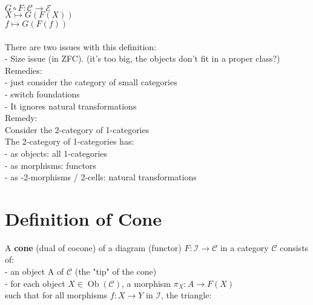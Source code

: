 \documentclass[a4paper, twoside, english, 11pt]{book}
\DeclareMathOperator{\Ob}{Ob}
\newcommand{\C}{\mathcal C}
\newcommand{\I}{\mathcal I}
\newcommand{\E}{\mathcal E}
\begin{document}
\indent\indent
$G \circ F : \C \rightarrow \E$ \\
\indent\indent
$X \mapsto G(F(X))$ \\
\indent\indent
$f \mapsto G(F(f))$ \\\\

\noindent
There are two issues with this definition: \\

- Size issue (in ZFC). (it's too big, the objects don't fit in a proper class?) \\
\indent\indent
Remedies: \\

\indent\indent
- just consider the category of small categories \\

\indent\indent
- switch foundations \\

- It ignores natural transformations \\
\indent\indent
Remedy: \\
\indent\indent
Consider the 2-category of 1-categories \\

\indent\indent
The 2-category of 1-categories has: \\

\indent\indent\indent
- as objects: all 1-categories \\

\indent\indent\indent
- as morphisms: functors \\

\indent\indent\indent
- as -2-morphisms / 2-cells: natural transformations \\



\section{Definition of Cone}

A \textbf{cone} (dual of cocone) of a diagram (functor) $F : \I \rightarrow \C$ in a category $\C$ consists of: \\

- an object A of $\C$ (the "tip" of the cone) \\

- for each object $X \in \Ob(\C)$, a morphism $\pi_X : A \rightarrow F(X)$ \\

\noindent
such that for all morphisms $f: X \rightarrow Y$ in $\I$, the triangle: \\
\end{document}
